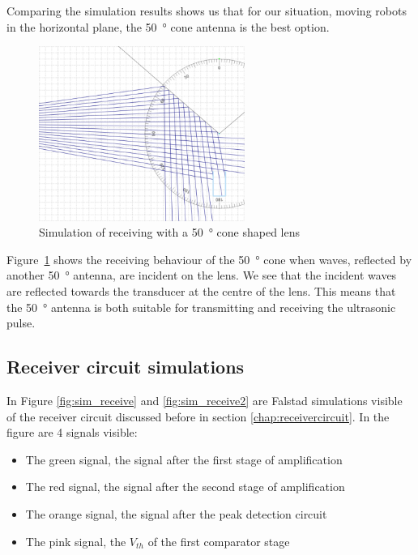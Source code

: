 Comparing the simulation results shows us that for our situation, moving robots in the horizontal plane, the \SI{50}{\degree} cone antenna is the best option.

\begin{figure}[H]
\centering
\includegraphics[width=0.6\textwidth]{Figures/sim_cone_rec.PNG}
\caption{Simulation of receiving with a \SI{50}{\degree} cone shaped lens}
\label{fig:sim_cone_rec}
\end{figure}

Figure~\ref{fig:sim_cone_rec} shows the receiving behaviour of the \SI{50}{\degree} cone when waves, reflected by another \SI{50}{\degree} antenna, are incident on the lens.
We see that the incident waves are reflected towards the transducer at the centre of the lens.
This means that the \SI{50}{\degree} antenna is both suitable for transmitting and receiving the ultrasonic pulse.

\subsection{Receiver circuit simulations}

In Figure \ref{fig:sim_receive} and \ref{fig:sim_receive2} are Falstad \cite{Falstad}
simulations visible of the receiver circuit discussed before in section \ref{chap:receivercircuit}. In the figure are 4 signals visible:

\begin{itemize}
\item
The green signal, the signal after the first stage of amplification
\item
The red signal, the signal after the second stage of amplification
\item
The orange signal, the signal after the peak detection circuit
\item
The pink signal, the $V_{th}$ of the first comparator stage
\end{itemize}

